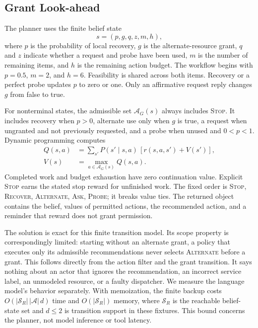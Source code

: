 \documentclass[letterpaper]{article}
\newcommand{\op}[1]{\textsc{#1}}
\begin{document}
\subsection{Grant Look-ahead}
The planner uses the finite belief state
\begin{equation}
 s=(p,g,q,z,m,h),
\end{equation}
where $p$ is the probability of local recovery, $g$ is the alternate-resource grant, $q$ and $z$ indicate whether a request and probe have been used, $m$ is the number of remaining items, and $h$ is the remaining action budget. The workflow begins with $p=0.5$, $m=2$, and $h=6$. Feasibility is shared across both items. Recovery or a perfect probe updates $p$ to zero or one. Only an affirmative request reply changes $g$ from false to true.

For nonterminal states, the admissible set $\mathcal A_G(s)$ always includes \op{Stop}. It includes recovery when $p>0$, alternate use only when $g$ is true, a request when ungranted and not previously requested, and a probe when unused and $0<p<1$. Dynamic programming computes
\begin{align}
 Q(s,a)&=\sum_{s'}P(s'\mid s,a)\,[r(s,a,s')+V(s')],\\
 V(s)&=\max_{a\in\mathcal A_G(s)}Q(s,a).
\end{align}
Completed work and budget exhaustion have zero continuation value. Explicit \op{Stop} earns the stated stop reward for unfinished work. The fixed order is \op{Stop}, \op{Recover}, \op{Alternate}, \op{Ask}, \op{Probe}; it breaks value ties. The returned object contains the belief, values of permitted actions, the recommended action, and a reminder that reward does not grant permission.

The solution is exact for this finite transition model. Its scope property is correspondingly limited: starting without an alternate grant, a policy that executes only its admissible recommendations never selects \op{Alternate} before a grant. This follows directly from the action filter and the grant transition. It says nothing about an actor that ignores the recommendation, an incorrect service label, an unmodeled resource, or a faulty dispatcher. We measure the language model's behavior separately. With memoization, the finite backup costs $O(|\mathcal S_R|\,|\mathcal A|\,d)$ time and $O(|\mathcal S_R|)$ memory, where $\mathcal S_R$ is the reachable belief-state set and $d\leq 2$ is transition support in these fixtures. This bound concerns the planner, not model inference or tool latency.
\end{document}
